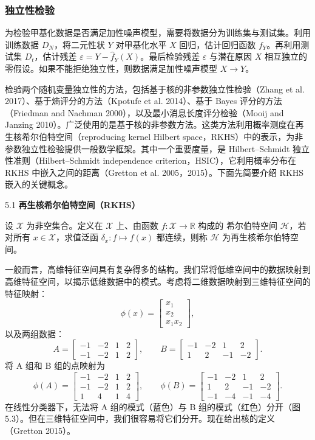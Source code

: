 \subsubsection{独立性检验}

为检验甲基化数据是否满足加性噪声模型，需要将数据分为训练集与测试集。利用训练数据 $D_N$，将二元性状 $Y$ 对甲基化水平 $X$ 回归，估计回归函数 $f_Y$。再利用测试集 $D_t$，估计残差 $\varepsilon=Y-\widehat f_Y(X)$。最后检验残差 $\varepsilon$ 与潜在原因 $X$ 相互独立的零假设。如果不能拒绝独立性，则数据满足加性噪声模型 $X\to Y$。

检验两个随机变量独立性的方法，包括基于核的非参数独立性检验（Zhang et al. 2017）、基于熵评分的方法（Kpotufe et al. 2014）、基于 Bayes 评分的方法（Friedman and Nachman 2000），以及最小消息长度评分检验（Mooij and Janzing 2010）。广泛使用的是基于核的非参数方法。这类方法利用概率测度在再生核希尔伯特空间（reproducing kernel Hilbert space，RKHS）中的表示，为非参数独立性检验提供一般数学框架。其中一个重要度量，是 Hilbert–Schmidt 独立性准则（Hilbert–Schmidt independence criterion，HSIC），它利用概率分布在 RKHS 中嵌入之间的距离（Gretton et al. 2005，2015）。下面先简要介绍 RKHS 嵌入的关键概念。


\begin{bookdefinition}{5.1}
\textbf{再生核希尔伯特空间（RKHS）}

设 $\mathcal X$ 为非空集合。定义在 $\mathcal X$ 上、由函数 $f:\mathcal X\to\mathbb R$ 构成的 希尔伯特空间 $\mathcal H$，若对所有 $x\in\mathcal X$，求值泛函 $\delta_x:f\mapsto f(x)$ 都连续，则称 $\mathcal H$ 为再生核希尔伯特空间。
\end{bookdefinition}

一般而言，高维特征空间具有复杂得多的结构。我们常将低维空间中的数据映射到高维特征空间，以揭示低维数据中的模式。考虑将二维数据映射到三维特征空间的特征映射：
\[
\phi(x)=\begin{bmatrix}x_1\\x_2\\x_1x_2\end{bmatrix},
\]
以及两组数据：
\[
A=\begin{bmatrix}-1&-2&1&2\\-1&-2&1&2\end{bmatrix},\qquad
B=\begin{bmatrix}-1&-2&1&2\\1&2&-1&-2\end{bmatrix}.
\]
将 A 组和 B 组的点映射为
\[
\phi(A)=\begin{bmatrix}-1&-2&1&2\\-1&-2&1&2\\1&4&1&4\end{bmatrix},\qquad
\phi(B)=\begin{bmatrix}-1&-2&1&2\\1&2&-1&-2\\-1&-4&-1&-4\end{bmatrix}.
\]
在线性分类器下，无法将 A 组的模式（蓝色）与 B 组的模式（红色）分开（图 5.3）。但在三维特征空间中，我们很容易将它们分开。现在给出核的定义（Gretton 2015）。


